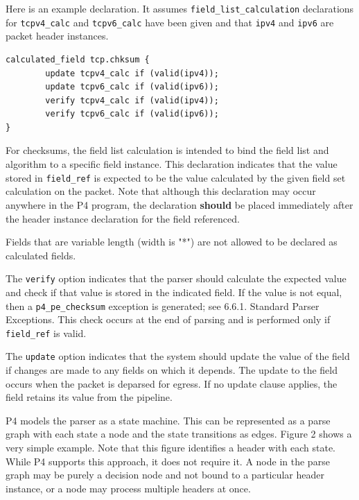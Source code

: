 \documentclass[12pt]{article}
\begin{document}
Here is an example declaration. It assumes \texttt{field_list_calculation} declarations 
for \texttt{tcpv4_calc} and \texttt{tcpv6_calc} have been given and that \texttt{ipv4} and \texttt{ipv6} are 
packet header instances.

\begin{lstlisting}[keywords={},frame=single,escapechar=\@]
calculated_field tcp.chksum {
        update tcpv4_calc if (valid(ipv4));
        update tcpv6_calc if (valid(ipv6));
        verify tcpv4_calc if (valid(ipv4));
        verify tcpv6_calc if (valid(ipv6));
}
\end{lstlisting}

For checksums, the field list calculation is intended to bind the field list 
and algorithm to a specific field instance. This declaration indicates that 
the value stored in \texttt{field_ref} is expected to be the value calculated by the 
given field set calculation on the packet. Note that although this declaration 
may occur anywhere in the P4 program, the declaration \textbf{should} be placed immediately 
after the header instance declaration for the field referenced.

Fields that are variable length (width is "*") are not allowed to be declared 
as calculated fields.

The \texttt{verify} option indicates that the parser should calculate the expected 
value and check if that value is stored in the indicated field. If the value 
is not equal, then a \texttt{p4_pe_checksum} exception is generated; see 6.6.1. 
Standard Parser Exceptions. This check occurs at the end of parsing and is 
performed only if \texttt{field_ref} is valid.

The \texttt{update} option indicates that the system should update the value of the 
field if changes are made to any fields on which it depends. The update to 
the field occurs when the packet is deparsed for egress. If no update clause 
applies, the field retains its value from the \matchaction pipeline.


P4 models the parser as a state machine. This can be represented as a parse 
graph with each state a node and the state transitions as edges. Figure 2 
shows a very simple example. Note that this figure identifies a header with 
each state. While P4 supports this approach, it does not require it. A node 
in the parse graph may be purely a decision node and not bound to a particular 
header instance, or a node may process multiple headers at once.
\end{document}
